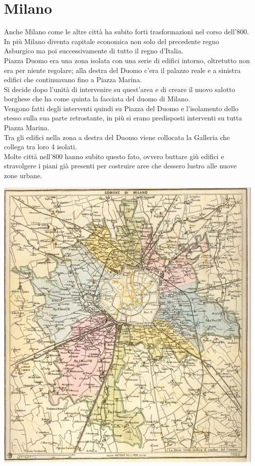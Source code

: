 \documentclass[a4paper,12pt, oneside]{book}
\begin{document}
  \section{Milano}
  Anche Milano come le altre città ha subito forti trasformazioni nel corso dell'800.\\ In più Milano diventa capitale economica non solo del precedente regno Asburgico ma poi successivamente di tutto il regno d'Italia.\\
  Piazza Duomo era una zona isolata con una serie di edifici intorno, oltretutto non era per niente regolare; alla destra del Duomo c'era il palazzo reale e a sinistra edifici che continuavano fino a Piazza Marina.\\
  Si decide dopo l'unità di intervenire su quest'area e di creare il nuovo salotto borghese che ha come quinta la facciata del duomo di Milano.\\
  Vengono fatti degli interventi quindi su Piazza del Duomo e l'isolamento dello stesso sulla sua parte retrostante, in più si erano predisposti interventi su tutta Piazza Marina.\\ Tra gli edifici nella zona a destra del Duomo viene collocata la Galleria che collega tra loro 4 isolati.\\
  Molte città nell'800 hanno subito questo fato, ovvero buttare giù edifici e stravolgere i piani già presenti per costruire aree che dessero lustro alle nuove zone urbane.\\
  \begin{center}
  	\includegraphics[width=0.6\linewidth]{"immagini/milano piantina"}
  	\label{fig:milano piantina}
  \end{center}
\end{document}

